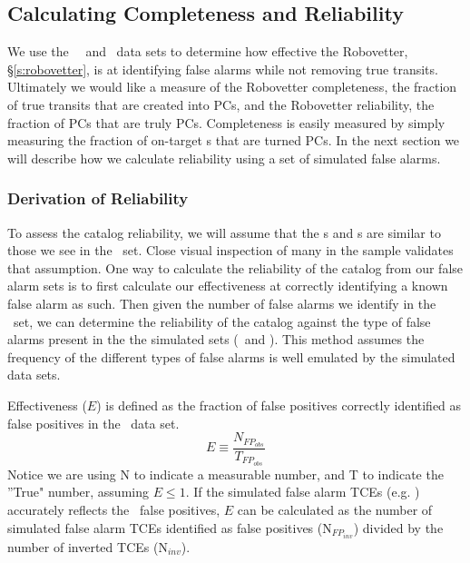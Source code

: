

\newcommand{\opsfp}{N$_{FP_{obs}}$}
\newcommand{\opspc}{N$_{PC_{obs}}$}
\newcommand{\opsN}{N$_{obs}$}
\newcommand{\trueopspc}{T$_{PC_{obs}}$}
\newcommand{\missedfp}{T$_{FP_{obs}}$ - N$_{FP_{obs}}$}
\newcommand{\invfp}{N$_{FP_{inv}}$}
\newcommand{\invpc}{N$_{PC_{inv}}$}
\newcommand{\invN}{N$_{inv}$}
\newcommand{\sfatce}{SFA-TCE}


\subsection{Calculating Completeness and Reliability}
We use the \injtce\, \scrtce\ and \invtce\ data sets to determine how effective the Robovetter, \S\ref{s:robovetter}, is at identifying false alarms while not removing true transits. Ultimately we would like a measure of the Robovetter completeness, the fraction of true transits that are created into PCs, and the Robovetter reliability, the fraction of PCs that are truly PCs.   Completeness is easily measured by simply measuring the fraction of on-target \injtce s that are turned PCs. In the next section we will describe how we calculate reliability using a set of simulated false alarms.

\subsubsection{Derivation of Reliability}
\label{s:relcalc}
To assess the catalog reliability, we will assume that the \scrtce s and \invtce s are similar to those we see in the \opstce\ set. Close visual inspection of many in the sample validates that assumption.  One way to calculate the reliability of the catalog from our false alarm sets is to first calculate our effectiveness at correctly identifying a known false alarm as such.  Then given the number of false alarms we identify in the \opstce\ set, we can determine the reliability of the catalog against the type of false alarms present in the the simulated sets (\invtce\ and \scrtce). This method assumes the frequency of the different types of false alarms is well emulated by the simulated data sets. 



Effectiveness ($E$) is defined as the fraction of false positives correctly identified as false positives in the \opstce\ data set. 
\begin{equation}
\label{effect1}
E \equiv \frac{N_{FP_{obs}}}{T_{FP_{obs}}}
\end{equation}
Notice we are using N to indicate a measurable number, and T to indicate the ''True" number, assuming $E\leq 1 $.  If the simulated false alarm TCEs (e.g. \invtce) accurately reflects the \opstce\ false positives, $E$ can be calculated as the number of simulated false alarm TCEs identified as false positives (\invfp) divided by the number of inverted TCEs (\invN). 

